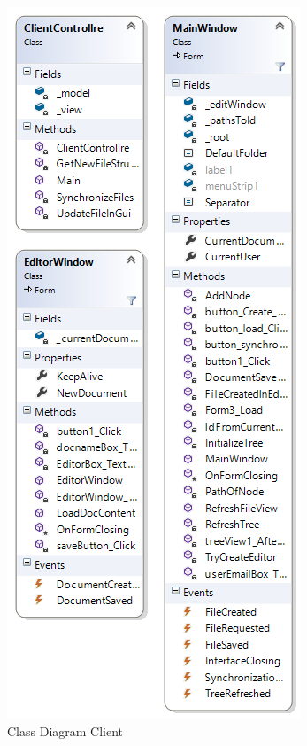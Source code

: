 \begin{figure}[H]
  \includegraphics[width=\textwidth]{illustrations/classDiagrams/offlineCD.png}
  \caption{Class Diagram Client}
\end{figure}
